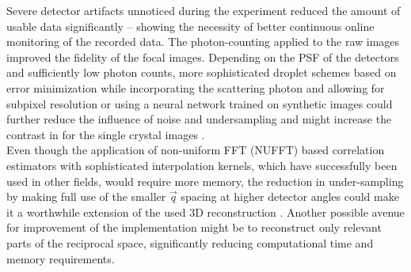 Severe detector artifacts unnoticed during the experiment reduced the amount of usable data significantly -- showing the necessity of better continuous online monitoring of the recorded data. The photon-counting applied to the raw images improved the fidelity of the focal images. Depending on the PSF of the detectors and sufficiently low photon counts, more sophisticated droplet schemes based on error minimization while incorporating the scattering photon and allowing for subpixel resolution or using a neural network trained on synthetic images could further reduce the influence of noise and undersampling and might increase the contrast in for the single crystal images \cite{baumann2018,collaboration2014,schayck2020,sun2020}.\\
Even though the application of non-uniform FFT (NUFFT) based correlation estimators with sophisticated interpolation kernels, which have successfully been used in other fields, would require more memory, the reduction in under-sampling by making full use of the smaller $\vec{q}$ spacing at higher detector angles could make it a worthwhile extension of the used 3D reconstruction \cite{laguna1998,yang2008,chang2020}. Another possible avenue for improvement of the implementation might be to reconstruct only relevant parts of the reciprocal space, significantly reducing computational time and memory requirements. 

